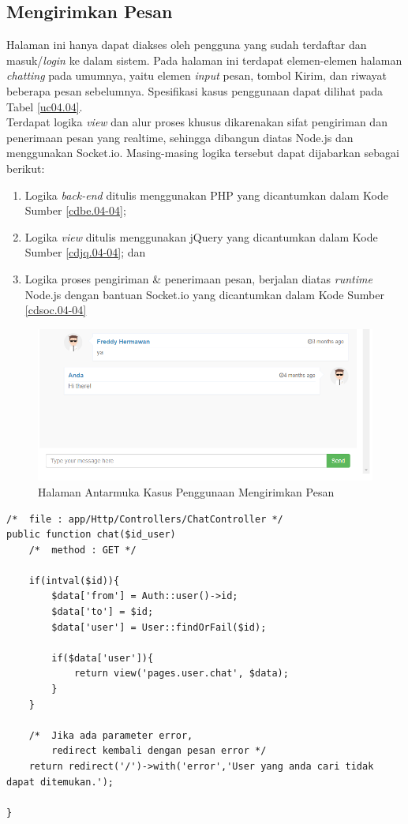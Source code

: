 \newpage
\subsection{Mengirimkan Pesan}
Halaman ini hanya dapat diakses oleh pengguna yang sudah terdaftar dan masuk/\textit{login} ke dalam sistem. Pada halaman ini terdapat elemen-elemen halaman \textit{chatting} pada umumnya, yaitu elemen \textit{input} pesan, tombol Kirim, dan riwayat beberapa pesan sebelumnya. Spesifikasi kasus penggunaan dapat dilihat pada Tabel \ref{uc04.04}.\\
\indent Terdapat logika \textit{view} dan alur proses khusus dikarenakan sifat pengiriman dan penerimaan pesan yang realtime, sehingga dibangun diatas Node.js dan menggunakan Socket.io. Masing-masing logika tersebut dapat dijabarkan sebagai berikut:
	\begin{enumerate}
		\item Logika \textit{back-end} ditulis menggunakan PHP yang dicantumkan dalam Kode Sumber \ref{cdbe.04-04}; 
		\item Logika \textit{view} ditulis menggunakan jQuery yang dicantumkan dalam Kode Sumber \ref{cdjq.04-04}; dan
		\item Logika proses pengiriman \& penerimaan pesan, berjalan diatas \textit{runtime} Node.js dengan bantuan Socket.io yang dicantumkan dalam Kode Sumber \ref{cdsoc.04-04}
	\end{enumerate}

\begin{figure}[H]
\centering
\includegraphics[width=\textwidth]{images/bab4/ui/04-04.png}
\caption{Halaman Antarmuka Kasus Penggunaan Mengirimkan Pesan}
\label{ui.04-04}
\end{figure}
\newpage
\begin{lstlisting}[label=cdbe.04-04,style=php,caption=Implementasi \textit{Back-end} Mengirimkan Pesan]
/*	file : app/Http/Controllers/ChatController */
public function chat($id_user)
	/*	method : GET */

    if(intval($id)){
        $data['from'] = Auth::user()->id;
        $data['to'] = $id;
        $data['user'] = User::findOrFail($id);

        if($data['user']){
            return view('pages.user.chat', $data);
        }
    }

    /* 	Jika ada parameter error, 
    	redirect kembali dengan pesan error */
    return redirect('/')->with('error','User yang anda cari tidak dapat ditemukan.');

}
\end{lstlisting}

